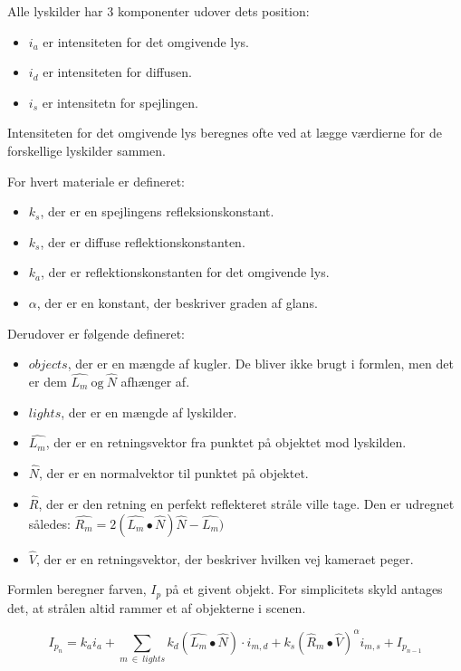 \documentclass{article}
\begin{document}
\begin{flushleft}
    Alle lyskilder har 3 komponenter udover dets position:
    \begin{itemize}
        \item \(i_a\) er intensiteten for det omgivende lys.
        \item \(i_d\) er intensiteten for diffusen.
        \item \(i_s\) er intensitetn for spejlingen.
    \end{itemize}

    Intensiteten for det omgivende lys beregnes ofte ved at lægge værdierne for de forskellige lyskilder sammen.

    For hvert materiale er defineret:
    \begin{itemize}
        \item \(k_s\), der er en spejlingens refleksionskonstant.
        \item \(k_s\), der er diffuse reflektionskonstanten.
        \item \(k_a\), der er reflektionskonstanten for det omgivende lys.
        \item \(\alpha \), der er en konstant, der beskriver graden af glans.
    \end{itemize}

    Derudover er følgende defineret:
    \begin{itemize}
        \item \(objects\), der er en mængde af kugler. De bliver ikke brugt i formlen, men det er dem \(\hat{L_m} \ \textrm{og} \ \hat{N}\) afhænger af.
        \item \(lights\), der er en mængde af lyskilder.
        \item \(\hat{L_m}\), der er en retningsvektor fra punktet på objektet mod lyskilden.
        \item \(\hat{N}\), der er en normalvektor til punktet på objektet.
        \item \(\hat{R}\), der er den retning en perfekt reflekteret stråle ville tage.
              Den er udregnet således: \(\hat{R_m} = 2(\hat{L_m} \bullet \hat{N})\hat{N}-\hat{L_m})\)
        \item \(\hat{V}\), der er en retningsvektor, der beskriver hvilken vej kameraet peger.
    \end{itemize}

    Formlen beregner farven, \(I_p\) på et givent objekt. For simplicitets skyld antages det,
    at strålen altid rammer et af objekterne i scenen.

    \begin{equation}
        I_{p_n} = k_ai_a + \sum_{m \ \in \ lights}{k_d(\hat{L_m} \bullet \hat{N})\cdot i_{m,d} + k_s(\hat{R}_m \bullet \hat{V})^\alpha i_{m,s}} + I_{p_{n-1}}
    \end{equation}


\end{flushleft}
\end{document}
